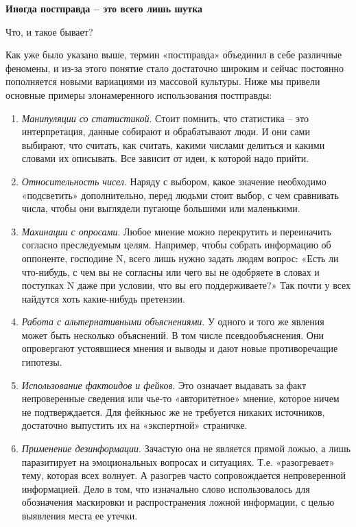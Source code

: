 \textbf{Иногда постправда – это всего лишь шутка}

Что, и такое бывает?

Как уже было указано выше, термин «постправда» объединил в себе различные феномены, и из-за этого понятие стало достаточно широким и сейчас постоянно пополняется новыми вариациями из массовой культуры. Ниже мы привели основные примеры злонамеренного использования постправды:

\begin{enumerate}
    \item \textit{Манипуляции со статистикой}. Стоит помнить, что статистика – это интерпретация, данные собирают и обрабатывают люди. И они сами выбирают, что считать, как считать, какими числами делиться и какими словами их описывать. Все зависит от идеи, к которой надо прийти.
    \item \textit{Относительность чисел}. Наряду с выбором, какое значение необходимо «подсветить» дополнительно, перед людьми стоит выбор, с чем сравнивать числа, чтобы они выглядели пугающе большими или маленькими.
    \item \textit{Махинации с опросами}. Любое мнение можно перекрутить и переиначить согласно преследуемым целям. Например, чтобы собрать информацию об оппоненте, господине N, всего лишь нужно задать людям вопрос: «Есть ли что-нибудь, с чем вы не согласны или чего вы не одобряете в словах и поступках N даже при условии, что вы его поддерживаете?» Так почти у всех найдутся хоть какие-нибудь претензии.
    \item \textit{Работа с альтернативными объяснениями}. У одного и того же явления может быть несколько объяснений. В том числе псевдообъяснения. Они опровергают устоявшиеся мнения и выводы и дают новые противоречащие гипотезы.
    \item \textit{Использование фактоидов и фейков}. Это означает выдавать за факт непроверенные сведения или чье-то «авторитетное» мнение, которое ничем не подтверждается. Для фейкньюс же не требуется никаких источников, достаточно выпустить их на «экспертной» страничке.
    \item \textit{Применение дезинформации}. Зачастую она не является прямой ложью, а лишь паразитирует на эмоциональных вопросах и ситуациях. Т.е. «разогревает» тему, которая всех волнует. А разогрев часто сопровождается непроверенной информацией. Дело в том, что изначально слово использовалось для обозначения маскировки и распространения ложной информации, с целью выявления места ее утечки.
\end{enumerate}

